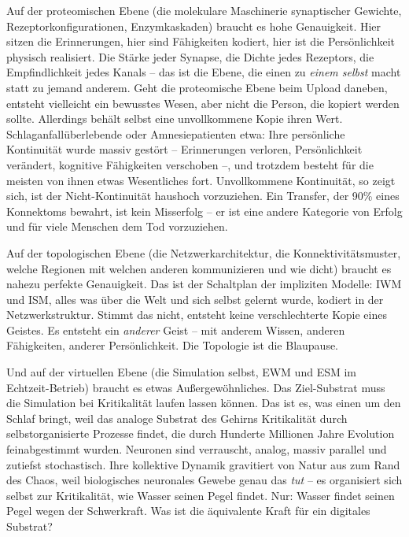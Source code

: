 \documentclass[11pt, twoside, openright]{book}
\begin{document}
Auf der proteomischen Ebene (die molekulare Maschinerie synaptischer Gewichte, Rezeptorkonfigurationen, Enzymkaskaden) braucht es hohe Genauigkeit. Hier sitzen die Erinnerungen, hier sind Fähigkeiten kodiert, hier ist die Persönlichkeit physisch realisiert. Die Stärke jeder Synapse, die Dichte jedes Rezeptors, die Empfindlichkeit jedes Kanals -- das ist die Ebene, die einen zu \textit{einem selbst} macht statt zu jemand anderem. Geht die proteomische Ebene beim Upload daneben, entsteht vielleicht ein bewusstes Wesen, aber nicht die Person, die kopiert werden sollte. Allerdings behält selbst eine unvollkommene Kopie ihren Wert. Schlaganfallüberlebende oder Amnesiepatienten etwa: Ihre persönliche Kontinuität wurde massiv gestört -- Erinnerungen verloren, Persönlichkeit verändert, kognitive Fähigkeiten verschoben --, und trotzdem besteht für die meisten von ihnen etwas Wesentliches fort. Unvollkommene Kontinuität, so zeigt sich, ist der Nicht-Kontinuität haushoch vorzuziehen. Ein Transfer, der 90\% eines Konnektoms bewahrt, ist kein Misserfolg -- er ist eine andere Kategorie von Erfolg und für viele Menschen dem Tod vorzuziehen.

Auf der topologischen Ebene (die Netzwerkarchitektur, die Konnektivitätsmuster, welche Regionen mit welchen anderen kommunizieren und wie dicht) braucht es nahezu perfekte Genauigkeit. Das ist der Schaltplan der impliziten Modelle: IWM und ISM, alles was über die Welt und sich selbst gelernt wurde, kodiert in der Netzwerkstruktur. Stimmt das nicht, entsteht keine verschlechterte Kopie eines Geistes. Es entsteht ein \textit{anderer} Geist -- mit anderem Wissen, anderen Fähigkeiten, anderer Persönlichkeit. Die Topologie ist die Blaupause.

Und auf der virtuellen Ebene (die Simulation selbst, EWM und ESM im Echtzeit-Betrieb) braucht es etwas Außergewöhnliches. Das Ziel-Substrat muss die Simulation bei Kritikalität laufen lassen können. Das ist es, was einen um den Schlaf bringt, weil das analoge Substrat des Gehirns Kritikalität durch selbstorganisierte Prozesse findet, die durch Hunderte Millionen Jahre Evolution feinabgestimmt wurden. Neuronen sind verrauscht, analog, massiv parallel und zutiefst stochastisch. Ihre kollektive Dynamik gravitiert von Natur aus zum Rand des Chaos, weil biologisches neuronales Gewebe genau das \textit{tut} -- es organisiert sich selbst zur Kritikalität, wie Wasser seinen Pegel findet. Nur: Wasser findet seinen Pegel wegen der Schwerkraft. Was ist die äquivalente Kraft für ein digitales Substrat?
\end{document}

